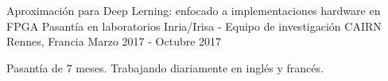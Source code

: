 

\begin{cventries}

\cventry
{Aproximación para Deep Lerning: enfocado a implementaciones hardware en FPGA} 
{Pasantía en laboratorios Inria/Irisa - Equipo de investigación CAIRN} %
{Rennes, Francia} %
{Marzo 2017 - Octubre 2017} %
{
	\begin{cvitems} %
		\item {Pasantía de 7 meses. Trabajando diariamente en inglés y francés.}
	\end{cvitems}
}



\end{cventries}
